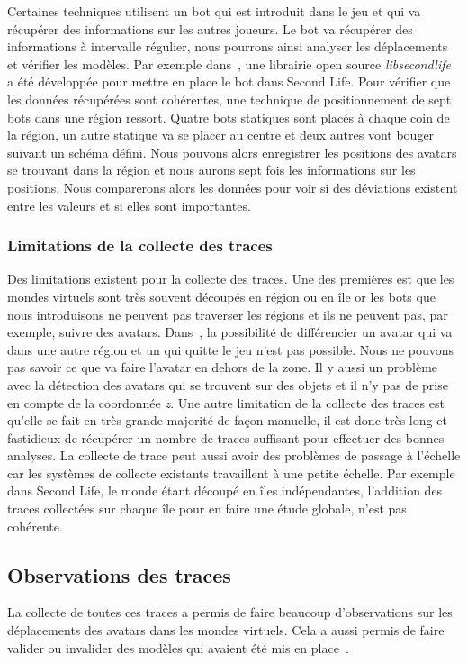 	\par Certaines techniques utilisent un bot qui est introduit dans le jeu et qui va récupérer des informations sur les autres joueurs. Le bot va récupérer des informations à intervalle régulier, nous pourrons ainsi analyser les déplacements et vérifier les modèles. Par exemple dans~\cite{DBLP:journals/corr/abs-0807-2328}, une librairie open source \textit{libsecondlife} a été développée pour mettre en place le bot dans Second Life. Pour vérifier que les données récupérées sont cohérentes, une technique de positionnement de sept bots dans une région ressort. Quatre bots statiques sont placés à chaque coin de la région, un autre statique va se placer au centre et deux autres vont bouger suivant un schéma défini. Nous pouvons alors enregistrer les positions des avatars se trouvant dans la région et nous aurons sept fois les informations sur les positions. Nous comparerons alors les données pour voir si des déviations existent entre les valeurs et si elles sont importantes.\\  
 		\subsubsection{Limitations de la collecte des traces}
	Des limitations existent pour la collecte des traces. Une des premières est que les mondes virtuels sont très souvent découpés en région ou en île or les bots que nous introduisons ne peuvent pas traverser les régions et ils ne peuvent pas, par exemple, suivre des avatars. Dans~\cite{DBLP:journals/corr/abs-0807-2328}, la possibilité de différencier un avatar qui va dans une autre région et un qui quitte le jeu n'est pas possible. Nous ne pouvons pas savoir ce que va faire l'avatar en dehors de la zone. Il y aussi un problème avec la détection des avatars qui se trouvent sur des objets et il n'y pas de prise en compte de la coordonnée \textit{z}. Une autre limitation de la collecte des traces est qu'elle se fait en très grande majorité de façon manuelle, il est donc très long et fastidieux de récupérer un nombre de traces suffisant pour effectuer des bonnes analyses. La collecte de trace peut aussi avoir des problèmes de passage à l'échelle car les systèmes de collecte existants travaillent à une petite échelle. Par exemple dans Second Life, le monde étant découpé en îles indépendantes, l'addition des traces collectées sur chaque île pour en faire une étude globale, n'est pas cohérente.

	\subsection{Observations des traces}
	 La collecte de toutes ces traces a permis de faire beaucoup d'observations sur les déplacements des avatars dans les mondes virtuels. Cela a aussi permis de faire valider ou invalider des modèles qui avaient été mis en place~\cite{DBLP:journals/corr/abs-0807-2328}. 

